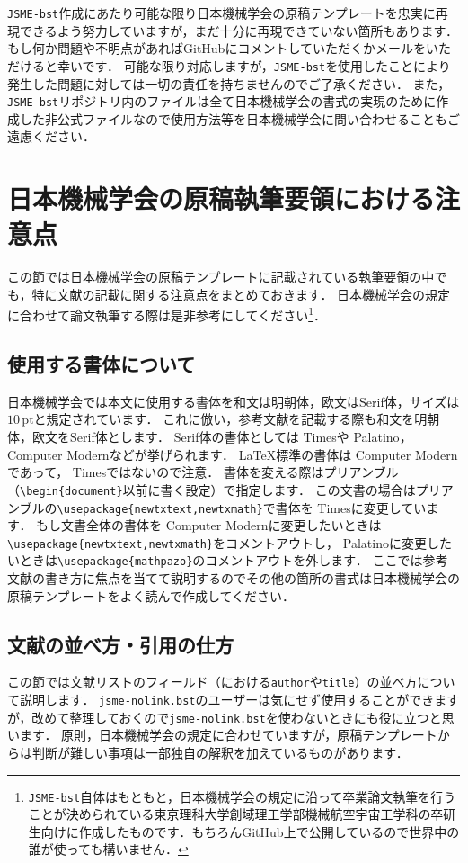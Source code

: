 \documentclass[a4paper,fleqn,uplatex,dvipdfmx]{jsarticle}
\newcommand{\jsmefile}{\texttt{jsme-nolink.bst}}
\newcommand{\JSMErepos}{\texttt{JSME-bst}}
\begin{document}
\JSMErepos 作成にあたり可能な限り日本機械学会の原稿テンプレートを忠実に再現できるよう努力していますが，まだ十分に再現できていない箇所もあります．
もし何か問題や不明点があればGitHubにコメントしていただくかメールをいただけると幸いです．
可能な限り対応しますが，\JSMErepos を使用したことにより発生した問題に対しては一切の責任を持ちませんのでご了承ください．
また，\JSMErepos リポジトリ内のファイルは全て日本機械学会の書式の実現のために作成した非公式ファイルなので使用方法等を日本機械学会に問い合わせることもご遠慮ください．


\section{日本機械学会の原稿執筆要領における注意点}
\label{sec:caution}
この節では日本機械学会の原稿テンプレートに記載されている執筆要領の中でも，特に文献の記載に関する注意点をまとめておきます．
日本機械学会の規定に合わせて論文執筆する際は是非参考にしてください\footnote{\JSMErepos 自体はもともと，日本機械学会の規定に沿って卒業論文執筆を行うことが決められている東京理科大学創域理工学部機械航空宇宙工学科の卒研生向けに作成したものです．もちろんGitHub上で公開しているので世界中の誰が使っても構いません．}．

\subsection{使用する書体について}
日本機械学会では本文に使用する書体を和文は明朝体，欧文はSerif体，サイズは$10\,\mathrm{pt}$と規定されています．
これに倣い，参考文献を記載する際も和文を明朝体，欧文をSerif体とします．
Serif体の書体としては{ Times}や{ Palatino}，{ Computer Modern}などが挙げられます．
\LaTeX{}標準の書体は{ Computer Modern}であって，{ Times}ではないので注意．
書体を変える際はプリアンブル（\verb|\begin{document}|以前に書く設定）で指定します．
この文書の場合はプリアンブルの\verb|\usepackage{newtxtext,newtxmath}|で書体を{ Times}に変更しています．
もし文書全体の書体を{ Computer Modern}に変更したいときは\verb|\usepackage{newtxtext,newtxmath}|をコメントアウトし，{ Palatino}に変更したいときは\verb|\usepackage{mathpazo}|のコメントアウトを外します．
ここでは参考文献の書き方に焦点を当てて説明するのでその他の箇所の書式は日本機械学会の原稿テンプレートをよく読んで作成してください．

\subsection{文献の並べ方・引用の仕方}
この節では文献リストのフィールド（\BibTeX{}における\verb|author|や\verb|title|）の並べ方について説明します．
\jsmefile のユーザーは気にせず使用することができますが，改めて整理しておくので\jsmefile を使わないときにも役に立つと思います．
原則，日本機械学会の規定に合わせていますが，原稿テンプレートからは判断が難しい事項は一部独自の解釈を加えているものがあります．
\end{document}

